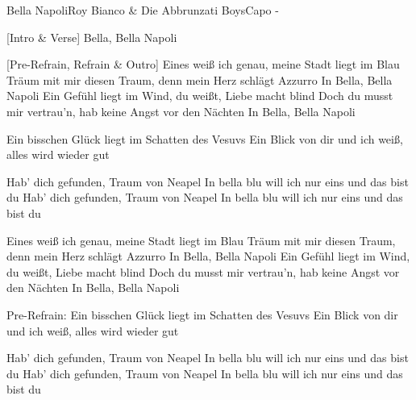 \begin{song}{Bella Napoli}{Roy Bianco \& Die Abbrunzati Boys}{Capo -}

[Intro & Verse]
Bella, Bella Napoli

[Pre-Refrain, Refrain & Outro]
Eines weiß ich genau, meine Stadt liegt im Blau
Träum mit mir diesen Traum, denn mein Herz schlägt Azzurro
In Bella, Bella Napoli
Ein Gefühl liegt im Wind, du weißt, Liebe macht blind
Doch du musst mir vertrau'n, hab keine Angst vor den Nächten
In Bella, Bella Napoli

Ein bisschen Glück liegt im Schatten des Vesuvs
Ein Blick von dir und ich weiß, alles wird wieder gut

Hab' dich gefunden, Traum von Neapel
In bella blu will ich nur eins und das bist du
Hab' dich gefunden, Traum von Neapel
In bella blu will ich nur eins und das bist du

Eines weiß ich genau, meine Stadt liegt im Blau
Träum mit mir diesen Traum, denn mein Herz schlägt Azzurro
In Bella, Bella Napoli
Ein Gefühl liegt im Wind, du weißt, Liebe macht blind
Doch du musst mir vertrau'n, hab keine Angst vor den Nächten
In Bella, Bella Napoli

Pre-Refrain:
Ein bisschen Glück liegt im Schatten des Vesuvs
Ein Blick von dir und ich weiß, alles wird wieder gut

Hab' dich gefunden, Traum von Neapel
In bella blu will ich nur eins und das bist du
Hab' dich gefunden, Traum von Neapel
In bella blu will ich nur eins und das bist du


\end{song}
